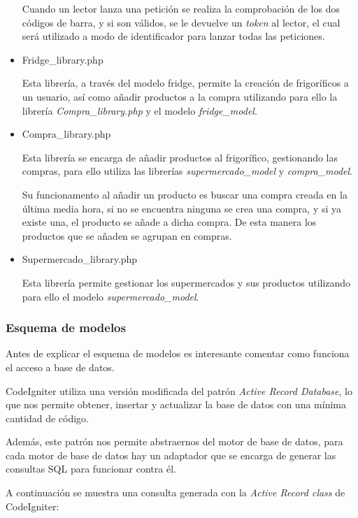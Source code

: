 \begin{itemize}
            Cuando un lector lanza una petición se realiza la comprobación de los dos códigos de barra, y si son válidos, se le devuelve un \emph{token} al lector, el cual será utilizado a modo de identificador para lanzar todas las peticiones.

        \item Fridge\_library.php

            Esta librería, a través del modelo fridge, permite la creación de frigoríficos a un usuario, así como añadir productos a la compra utilizando para ello la librería \emph{Compra\_library.php} y el modelo \emph{fridge\_model}.

        \item Compra\_library.php

            Esta librería se encarga de añadir productos al frigorífico, gestionando las compras, para ello utiliza las librerías \emph{supermercado\_model} y \emph{compra\_model}.

            Su funcionamento al añadir un producto es buscar una compra creada en la última media hora, si no se encuentra ninguna se crea una compra, y si ya existe una, el producto se añade a dicha compra. De esta manera los productos que se añaden se agrupan en compras.

        \item Supermercado\_library.php

            Esta librería permite gestionar los supermercados y sus productos utilizando para ello el modelo \emph{supermercado\_model}.
    \end{itemize}

    \subsubsection{Esquema de modelos}

        Antes de explicar el esquema de modelos es interesante comentar como funciona el acceso a base de datos.

        CodeIgniter utiliza una versión modificada del patrón \emph{Active Record Database}, lo que nos permite obtener, insertar y actualizar la base de datos con una mínima cantidad de código.

        Además, este patrón nos permite abstraernos del motor de base de datos, para cada motor de base de datos hay un adaptador que se encarga de generar las consultas SQL para funcionar contra él.

        A continuación se muestra una consulta generada con la \emph{Active Record class} de CodeIgniter:

